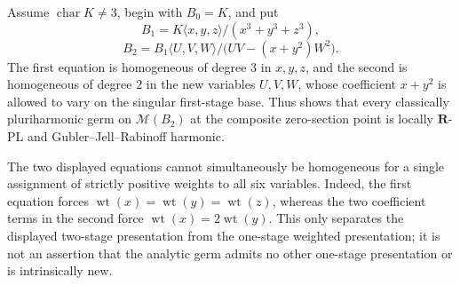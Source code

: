 \begin{example}
\label{ex:p061-iterated-weighted-cone-no-common-grading}
Assume \(\operatorname{char}K\ne3\), begin with \(B_0=K\), and put
\[
 B_1=K\langle x,y,z\rangle/(x^3+y^3+z^3),
\]
\[
 B_2=B_1\langle U,V,W\rangle/
       \bigl(UV-(x+y^2)W^2\bigr).
\]
The first equation is homogeneous of degree \(3\) in \(x,y,z\), and the
second is homogeneous of degree \(2\) in the new variables \(U,V,W\), whose
coefficient \(x+y^2\) is allowed to vary on the singular first-stage base.
Thus
 shows that every
classically pluriharmonic germ on \(\mathcal M(B_2)\) at the composite
zero-section point is locally \(\mathbf R\)-PL and
Gubler--Jell--Rabinoff harmonic.

The two displayed equations cannot simultaneously be homogeneous for a
single assignment of strictly positive weights to all six variables.
Indeed, the first equation forces
\(\operatorname{wt}(x)=\operatorname{wt}(y)=\operatorname{wt}(z)\), whereas
the two coefficient terms in the second force
\(\operatorname{wt}(x)=2\operatorname{wt}(y)\).  This only separates the
displayed two-stage presentation from the one-stage weighted presentation;
it is not an assertion that the analytic germ admits no other one-stage
presentation or is intrinsically new.
\end{example}
